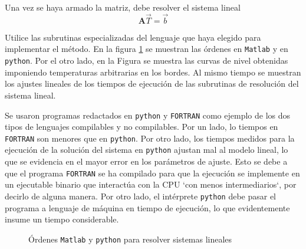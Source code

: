 Una vez se haya armado la matriz, debe resolver el sistema lineal
\begin{equation}\label{EqEcuacionSistemaLineal}
  \mathbf{A} \vec{T} = \vec{b}
\end{equation}

Utilice las subrutinas especializadas del lenguaje que haya elegido 
para implementar el método. En la figura \ref{FiguraCodeblockSolve}
se muestran las órdenes en \texttt{Matlab} y en \texttt{python}. 
Por el otro lado, en la Figura \label{FiguraResultadoTfija} se 
muestra las curvas de nivel obtenidas imponiendo temperaturas
arbitrarias en los bordes. Al mismo tiempo se muestran los ajustes
lineales de los tiempos de ejecución de las subrutinas de 
resolución del sistema lineal. 

Se usaron programas redactados en \texttt{python} y \texttt{FORTRAN}
como ejemplo de los dos tipos de lenguajes compilables y no compilables.
Por un lado, lo tiempos en \texttt{FORTRAN} son menores que en
\texttt{python}. Por otro lado, los tiempos medidos para la 
ejecución de la solución del sistema en \texttt{python} 
ajustan mal al modelo lineal, lo que se evidencia en el
mayor error en los parámetros de ajuste. Esto se debe a que
el programa \texttt{FORTRAN} se ha compilado para que la ejecución 
se implemente en un ejecutable binario que interactúa con 
la CPU `con menos intermediarios`, por decirlo de alguna 
manera. Por otro lado, el intérprete \texttt{python} 
debe pasar el programa a lenguaje de máquina en tiempo
de ejecución, lo que evidentemente insume un 
tiempo considerable.

\begin{figure}
  \caption{Órdenes \texttt{Matlab} y \texttt{python} para 
  resolver sistemas lineales\label{FiguraCodeblockSolve} }
\end{figure}

